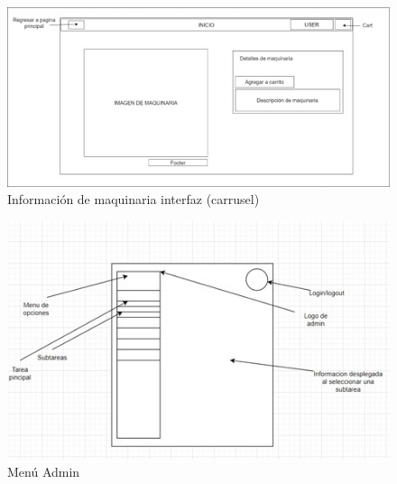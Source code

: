 \documentclass{article}
\begin{document}
\begin{figure}
    \centering
    \includegraphics[width=1.1\linewidth]{5.jpg}
    \caption{Información de maquinaria interfaz (carrusel)}
    \label{fig:enter-label}
\end{figure}
\begin{figure}
    \centering
    \includegraphics[width=1.1\linewidth]{6.jpg}
    \caption{Menú Admin}
    \label{fig:enter-label}
\end{figure}
\end{document}
